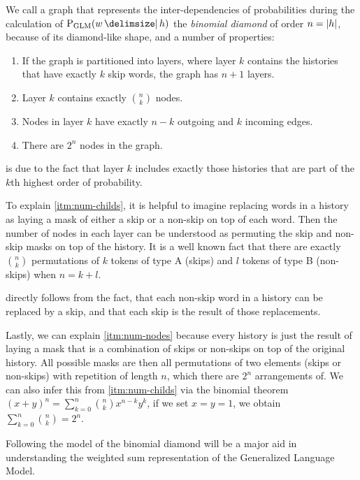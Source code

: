 We call a graph that represents the inter-dependencies of probabilities during
the calculation of $\ProbGLM{w}{h}$ the \emph{binomial diamond} of order
$n = {\left|h\right|}$, because of its diamond-like shape, and a number of
properties:

\begin{enumerate}
  \item \label{itm:num-layers} If the graph is partitioned into layers, where
    layer $k$ contains the histories that have exactly $k$ skip words, the graph
    has $n + 1$ layers.
  \item \label{itm:num-childs} Layer $k$ contains exactly $\binom{n}{k}$ nodes.
  \item \label{itm:num-edges}  Nodes in layer $k$ have exactly $n - k$ outgoing
    and $k$ incoming edges.
  \item \label{itm:num-nodes}  There are $2^n$ nodes in the graph.
\end{enumerate}

 is due to the fact that layer $k$ includes exactly those
histories that are part of the $k$th highest order of probability.

To explain \cref{itm:num-childs}, it is helpful to imagine replacing words in
a history as laying a mask of either a skip or a non-skip on top of each word.
Then the number of nodes in each layer can be understood as permuting the
skip and non-skip masks on top of the history.
It is a well known fact that there are exactly $\binom{n}{k}$ permutations of
$k$ tokens of type A (skips) and $l$ tokens of type B (non-skips) when
$n = k + l$.

 directly follows from the fact, that each non-skip word
in a history can be replaced by a skip, and that each skip is the result
of those replacements.

Lastly, we can explain \cref{itm:num-nodes} because every history is just the
result of laying a mask that is a combination of skips or non-skips on top of
the original history.
All possible masks are then all permutations of two elements (skips or
non-skips) with repetition of length $n$, which there are $2^n$ arrangements of.
We can also infer this from \cref{itm:num-childs} via the binomial theorem
$(x+ y)^n = \sum_{k=0}^n \binom{n}{k} x^{n-k} y^k$, if we set ${x = y = 1}$,
we obtain $\sum_{k=0}^n \binom{n}{k} = 2^n$.

Following the model of the binomial diamond will be a major aid in understanding
the weighted sum representation of the Generalized Language Model.

